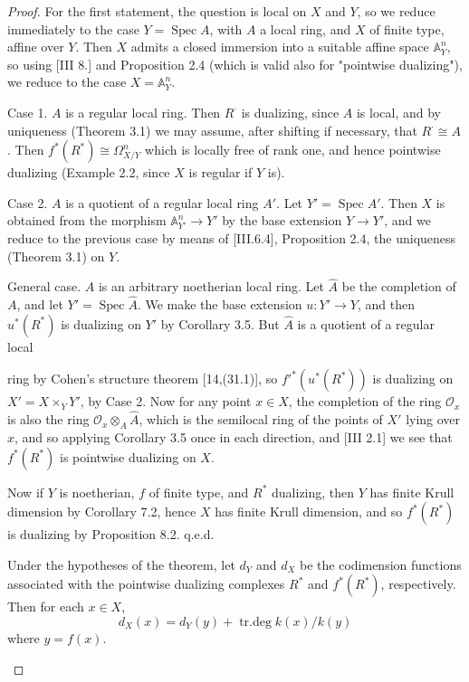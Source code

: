 \documentclass[12pt]{book}
\newcommand{\sheaf}[1]{\mathcal{#1}}
\DeclareMathOperator{\Spec}{Spec}
\begin{document}
\setcounter{page}{289}
\begin{proof}
For the first statement, the question is local on \(X\) and \(Y\), so we reduce immediately to the case \(Y=\Spec A\), with \(A\) a local ring, and \(X\) of finite type, affine over \(Y\). Then \(X\) admits a closed immersion into a suitable affine space \(\mathbb{A}_{Y}^{n}\), so using [III 8.] and Proposition 2.4 (which is valid also for "pointwise dualizing"), we reduce to the case \(X=\mathbb{A}_{Y}^{n}\).

Case 1. \(A\) is a regular local ring. Then \(R^{\cdot}\) is dualizing, since \(A\) is local, and by uniqueness (Theorem 3.1) we may assume, after shifting if necessary, that \(R^{\cdot} \cong A\).
Then \(f^{*}(R^{*}) \cong \Omega_{X/Y}^{n}\) which is locally free of rank one, and hence pointwise dualizing (Example 2.2, since \(X\) is regular if \(Y\) is).

Case 2. \(A\) is a quotient of a regular local ring \(A'\).
Let \(Y'=\Spec A'\).
Then \(X\) is obtained from the morphism \(\mathbb{A}_{Y'}^{n} \to Y'\) by the base extension \(Y \to Y'\), and we reduce to the previous case by means of [III.6.4], Proposition 2.4, the uniqueness (Theorem 3.1) on \(Y\).

General case. \(A\) is an arbitrary noetherian local ring. Let \(\hat{A}\) be the completion of \(A\), and let \(Y'=\Spec \hat{A}\).
We make the base extension \(u: Y' \to Y\), and then \(u^{*}(R^{*})\) is dualizing on \(Y'\) by Corollary 3.5. But \(\hat{A}\) is a quotient of a regular local

\setcounter{page}{290}
ring by Cohen's structure theorem [14,(31.1)], so \(f'^{*}(u^{*}(R^{*}))\) is dualizing on \(X'=X \times_{Y} Y'\), by Case 2. Now for any point \(x \in X\), the completion of the ring \(\sheaf{O}_{x}\) is also the ring \(\sheaf{O}_{x} \otimes_{A} \hat{A}\), which is the semilocal ring of the points of \(X'\) lying over \(x\), and so applying Corollary 3.5 once in each direction, and [III 2.1] we see that \(f^{*}(R^{*})\) is pointwise dualizing on \(X\).

Now if \(Y\) is noetherian, \(f\) of finite type, and \(R^{*}\) dualizing, then \(Y\) has finite Krull dimension by Corollary 7.2, hence \(X\) has finite Krull dimension, and so \(f^{*}(R^{*})\) is dualizing by Proposition 8.2. q.e.d.

\begin{corollary}
Under the hypotheses of the theorem, let \(d_{Y}\) and \(d_{X}\) be the codimension functions associated with the pointwise dualizing complexes \(R^{*}\) and \(f^{*}(R^{*})\), respectively. Then for each \(x \in X\),
\[d_{X}(x)=d_{Y}(y)+\operatorname{tr.deg}k(x)/k(y)\]
where \(y=f(x)\).
\end{corollary}


\end{proof}
\end{document}

